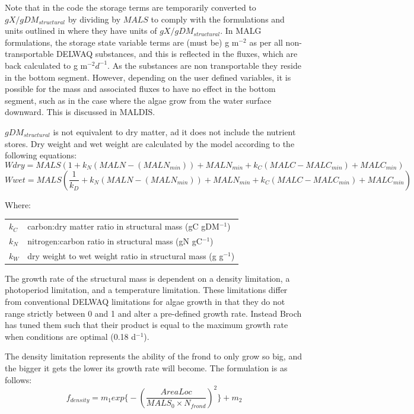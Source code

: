 \documentclass{deltares_manual}
\begin{document}
Note that in the code the storage terms are temporarily converted to $gX/gDM_{structural}$ by dividing by $MALS$ to comply with the formulations and units outlined in \cite{broch2012} where they have units of $gX/gDM_{structural}$. In MALG formulations, the storage state variable terms are (must be) g m$^{-2}$ as per all non-transportable DELWAQ substances, and this is reflected in the fluxes, which are back calculated to g m$^{-2}d^{-1}$. As the substances are non transportable they reside in the bottom segment. However, depending on the user defined variables, it is possible for the mass and associated fluxes to have no effect in the bottom segment, such as in the case where the algae grow from the water surface downward. This is discussed in MALDIS.

$gDM_{structural}$ is not equivalent to dry matter, ad it does not include the nutrient stores. Dry weight and wet weight are calculated by the model according to the following equations:
\begin{equation}
Wdry = MALS(1 + k_N(MALN - (MALN_{min})) + MALN_{min} + k_C(MALC - MALC_{min})+ MALC_{min})
\end{equation}
\begin{equation}
Wwet = MALS(\frac{1}{k_D} + k_N(MALN - (MALN_{min})) + MALN_{min} + k_C(MALC - MALC_{min}) + MALC_{min})
\end{equation}

Where:\\
\begin{tabular}{ll}
$k_C$        & carbon:dry matter ratio in structural mass (gC gDM$^{-1}$)\\
$k_N$        & nitrogen:carbon ratio in structural mass (gN gC$^{-1}$)\\
$k_W$        & dry weight to wet weight ratio in structural mass (g g$^{-1}$)\\
\end{tabular}
The growth rate of the structural mass is dependent on a density limitation, a photoperiod limitation, and a temperature limitation. These limitations differ from conventional DELWAQ limitations for algae growth in that they do not range strictly between 0 and 1 and alter a pre-defined growth rate. Instead Broch has tuned them such that their product is equal to the maximum growth rate when conditions are optimal (0.18 d$^{-1}$). 

The density limitation represents the ability of the frond to only grow so big, and the bigger it gets the lower its growth rate will become. The formulation is as follows:
\begin{equation}
f_{density} = m_1 exp\big\{-(\frac{AreaLoc}{MALS_0\times N_{frond}})^2 \big\}+m_2
\end{equation}
\end{document}
